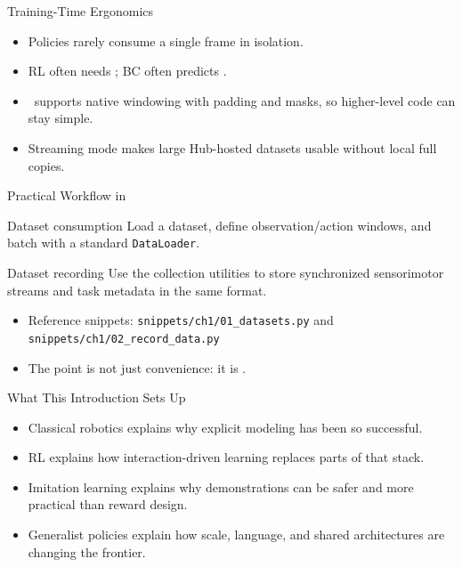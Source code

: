 \documentclass{beamer}
\begin{document}
\begin{frame}{Training-Time Ergonomics}
  \begin{itemize}
    \item Policies rarely consume a single frame in isolation.
    \item RL often needs ; BC often predicts .
    \item \lerobotdataset~supports native windowing with padding and masks, so higher-level code can stay simple.
    \item Streaming mode makes large Hub-hosted datasets usable without local full copies.
  \end{itemize}

  \vspace{0.2cm}
\end{frame}

\begin{frame}{Practical Workflow in \lerobot}
  \begin{block}{Dataset consumption}
    Load a dataset, define observation/action windows, and batch with a standard \texttt{DataLoader}.
  \end{block}

  \begin{block}{Dataset recording}
    Use the collection utilities to store synchronized sensorimotor streams and task metadata in the same format.
  \end{block}

  \begin{itemize}
    \item Reference snippets: \texttt{snippets/ch1/01\_datasets.py} and \texttt{snippets/ch1/02\_record\_data.py}
    \item The point is not just convenience: it is .
  \end{itemize}
\end{frame}

\begin{frame}{What This Introduction Sets Up}
  \begin{itemize}
    \item Classical robotics explains why explicit modeling has been so successful.
    \item RL explains how interaction-driven learning replaces parts of that stack.
    \item Imitation learning explains why demonstrations can be safer and more practical than reward design.
    \item Generalist policies explain how scale, language, and shared architectures are changing the frontier.
  \end{itemize}

  \vspace{0.25cm}
\end{frame}
\end{document}
